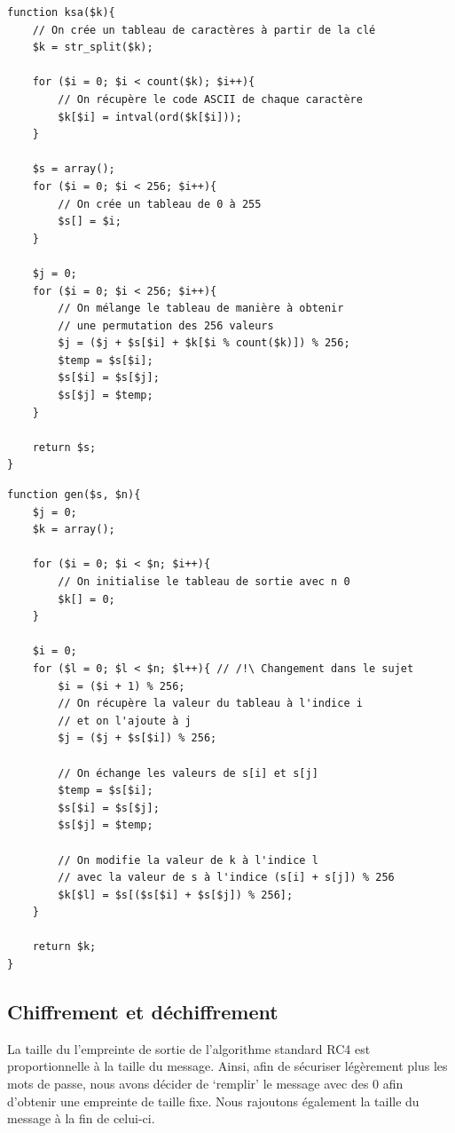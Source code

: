 \documentclass[12pt, a4paper]{article}
\begin{document}
\begin{lstlisting}[name=Fonction de génération de la permutation]
function ksa($k){
    // On crée un tableau de caractères à partir de la clé
    $k = str_split($k);
    
    for ($i = 0; $i < count($k); $i++){
        // On récupère le code ASCII de chaque caractère
        $k[$i] = intval(ord($k[$i]));
    }

    $s = array();
    for ($i = 0; $i < 256; $i++){
        // On crée un tableau de 0 à 255
        $s[] = $i;
    }

    $j = 0;
    for ($i = 0; $i < 256; $i++){
        // On mélange le tableau de manière à obtenir
        // une permutation des 256 valeurs
        $j = ($j + $s[$i] + $k[$i % count($k)]) % 256;
        $temp = $s[$i];
        $s[$i] = $s[$j];
        $s[$j] = $temp;
    }

    return $s;
}
\end{lstlisting}

\begin{lstlisting}[name=Fonction de génération de la suite chiffrante]
function gen($s, $n){
    $j = 0;
    $k = array();

    for ($i = 0; $i < $n; $i++){
        // On initialise le tableau de sortie avec n 0
        $k[] = 0;
    }
    
    $i = 0;
    for ($l = 0; $l < $n; $l++){ // /!\ Changement dans le sujet
        $i = ($i + 1) % 256;
        // On récupère la valeur du tableau à l'indice i
        // et on l'ajoute à j
        $j = ($j + $s[$i]) % 256;

        // On échange les valeurs de s[i] et s[j]
        $temp = $s[$i];
        $s[$i] = $s[$j];
        $s[$j] = $temp;

        // On modifie la valeur de k à l'indice l
        // avec la valeur de s à l'indice (s[i] + s[j]) % 256
        $k[$l] = $s[($s[$i] + $s[$j]) % 256];
    }

    return $k;
}
\end{lstlisting}

\subsection{Chiffrement et déchiffrement}

La taille du l'empreinte de sortie de l'algorithme standard RC4 est proportionnelle à la taille du message.
Ainsi, afin de sécuriser légèrement plus les mots de passe,
nous avons décider de `remplir' le message avec des 0 afin d'obtenir une empreinte de taille fixe.
Nous rajoutons également la taille du message à la fin de celui-ci.
\end{document}

